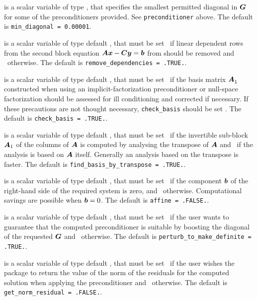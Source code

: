 \documentclass{galahad}
\begin{document}
\begin{description}


 is a scalar variable of type \realdp,
that specifies the smallest permitted diagonal in ${\bm{G}}$ for some
of the preconditioners provided. See {\tt preconditioner} above.
The default is {\tt min\_diagonal = 0.00001}.

 is a scalar variable of type default \logical,
that must be set \true\ if linear dependent rows from the second
block equation ${\bm{A}} {\bm{x}} - {\bm{C}} {\bm{y}} = {\bm{b}}$ from 
should be removed and \false\ otherwise.
The default is {\tt remove\_dependencies = .TRUE.}.

 is a scalar variable of type default \logical,
that must be set \true\ if the basis matrix ${\bm{A}}_{1}^{}$ constructed
when using an implicit-factorization preconditioner or null-space factorization
should be assessed for ill conditioning and corrected if necessary. If these
precautions are not thought necessary, {\tt check\_basis} should be
set \false. The default is {\tt check\_basis = .TRUE.}.

 is a scalar variable of type default \logical,
that must be set \true\ if the invertible sub-block ${\bm{A}}_1$ of the
columns of ${\bm{A}}$ is computed by analysing the transpose of ${\bm{A}}$
and \false\ if the analysis is based on ${\bm{A}}$ itself. Generally
an analysis based on the transpose is faster.
The default is {\tt find\_basis\_by\_transpose = .TRUE.}.

 is a scalar variable of type default \logical,
that must be set \true\ if the component ${\bm{b}}$ of the right-hand side
of the required system  is zero, and \false\ otherwise.
Computational savings are possible when ${\bm{b}} = 0$.
The default is {\tt affine = .FALSE.}.

 is a scalar variable of type default \logical,
that must be set \true\ if the user wants to guarantee that the
computed preconditioner is suitable by boosting the diagonal of the
requested ${\bm{G}}$ and \false\ otherwise.
The default is {\tt perturb\_to\_make\_definite = .TRUE.}.

 is a scalar variable of type default \logical,
that must be set \true\ if the user wishes the package to return
the value of the norm of the residuals for the computed solution
when applying the preconditioner and  \false\ otherwise.
The default is {\tt get\_norm\_residual = .FALSE.}.


\end{description}
\end{document}
